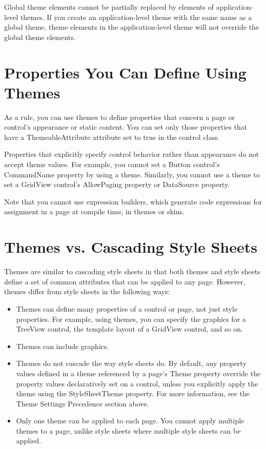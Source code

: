 Global theme elements cannot be partially replaced by elements of application-level themes. If you create an application-level theme with the same name as a global theme, theme elements in the application-level theme will not override the global theme elements.

\section{Properties You Can Define Using Themes}
As a rule, you can use themes to define properties that concern a page or control's appearance or static content. You can set only those properties that have a ThemeableAttribute attribute set to true in the control class.

Properties that explicitly specify control behavior rather than appearance do not accept theme values. For example, you cannot set a Button control's CommandName property by using a theme. Similarly, you cannot use a theme to set a GridView control's AllowPaging property or DataSource property.

Note that you cannot use expression builders, which generate code expressions for assignment in a page at compile time, in themes or skins.

\section{Themes vs. Cascading Style Sheets}
Themes are similar to cascading style sheets in that both themes and style sheets define a set of common attributes that can be applied to any page. However, themes differ from style sheets in the following ways:
\begin{itemize}
	\item Themes can define many properties of a control or page, not just style properties. For example, using themes, you can specify the graphics for a TreeView control, the template layout of a GridView control, and so on.	
	\item Themes can include graphics.	
	\item Themes do not cascade the way style sheets do. By default, any property values defined in a theme referenced by a page's Theme property override the property values declaratively set on a control, unless you explicitly apply the theme using the StyleSheetTheme property. For more information, see the Theme Settings Precedence section above.	
	\item Only one theme can be applied to each page. You cannot apply multiple themes to a page, unlike style sheets where multiple style sheets can be applied.
\end{itemize}

